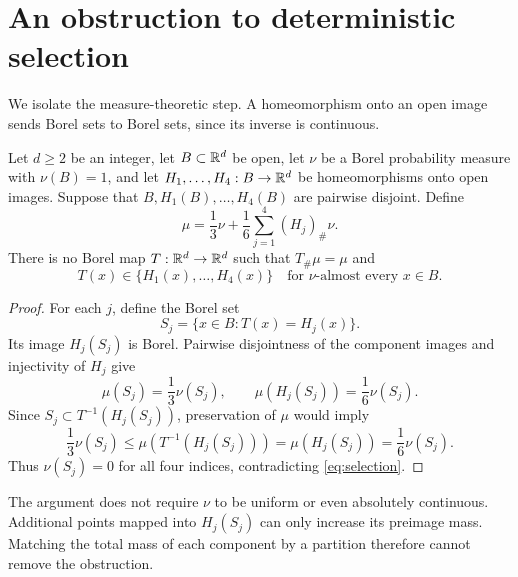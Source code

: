 \section{An obstruction to deterministic selection}\label{sec:splitting}

We isolate the measure-theoretic step. A homeomorphism onto an open
image sends Borel sets to Borel sets, since its inverse is
continuous.

\begin{lemma}\label{lem:splitting}
Let \(d\ge2\) be an integer, let \(B\subset\mathbb R^d\) be open, let
\(\nu\) be a Borel probability measure with \(\nu(B)=1\), and let
\(H_1,\ldots,H_4:B\to\mathbb R^d\) be homeomorphisms onto open images.
Suppose that \(B,H_1(B),\ldots,H_4(B)\) are pairwise disjoint.
Define
\begin{equation}\label{eq:split-measure}
 \mu=\frac13\nu+\frac16\sum_{j=1}^4(H_j)_\#\nu.
\end{equation}
There is no Borel map \(T:\mathbb R^d\to\mathbb R^d\) such that
\(T_\#\mu=\mu\) and
\begin{equation}\label{eq:selection}
 T(x)\in\{H_1(x),\ldots,H_4(x)\}
 \quad\text{for \(\nu\)-almost every }x\in B.
\end{equation}
\end{lemma}

\begin{proof}
For each \(j\), define the Borel set
\[
 S_j=\{x\in B:T(x)=H_j(x)\}.
\]
Its image \(H_j(S_j)\) is Borel. Pairwise disjointness of the
component images and injectivity of \(H_j\) give
\[
 \mu(S_j)=\frac13\nu(S_j),\qquad
 \mu(H_j(S_j))=\frac16\nu(S_j).
\]
Since \(S_j\subset T^{-1}(H_j(S_j))\), preservation of \(\mu\)
would imply
\[
 \frac13\nu(S_j)
 \le \mu(T^{-1}(H_j(S_j)))
 =\mu(H_j(S_j))
 =\frac16\nu(S_j).
\]
Thus \(\nu(S_j)=0\) for all four indices, contradicting
\eqref{eq:selection}.
\end{proof}

The argument does not require \(\nu\) to be uniform or even
absolutely continuous. Additional points mapped into \(H_j(S_j)\)
can only increase its preimage mass. Matching the total mass of
each component by a partition therefore cannot remove the
obstruction.


